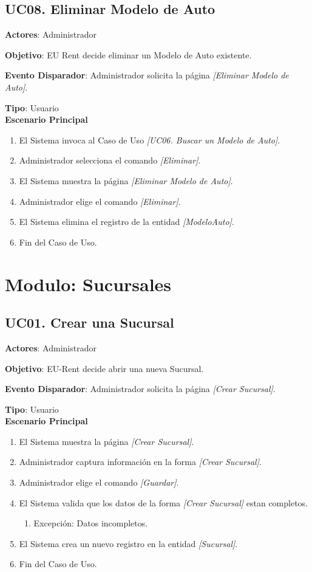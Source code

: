 \documentclass[10pt, letterpaper]{report}
\begin{document}
\subsection{UC08. Eliminar Modelo de Auto} \label{EliminarModeloAuto}
\textbf{Actores}: Administrador

\textbf{Objetivo}: EU Rent decide eliminar un Modelo de Auto existente.

\textbf{Evento Disparador}: Administrador solicita la página \textit{[Eliminar Modelo de Auto]}.

\textbf{Tipo}: Usuario\\

\textbf{Escenario Principal}

\begin{enumerate}
\item El Sistema invoca al Caso de Uso \textit{[UC06. Buscar un Modelo de Auto]}.
\item Administrador selecciona el comando \textit{[Eliminar]}.
\item El Sistema muestra la página \textit{[Eliminar Modelo de Auto]}.
\item Administrador elige el comando \textit{[Eliminar]}.
\item El Sistema elimina el registro de la entidad \textit{[ModeloAuto]}.
\item Fin del Caso de Uso.
\end{enumerate}
\section{Modulo: Sucursales}

\subsection{UC01. Crear una Sucursal} \label{CrearSucursal}
\textbf{Actores}: Administrador

\textbf{Objetivo}: EU-Rent decide abrir una nueva Sucursal.

\textbf{Evento Disparador}: Administrador solicita la página \textit{[Crear Sucursal]}.

\textbf{Tipo}: Usuario\\

\textbf{Escenario Principal}

\begin{enumerate}
\item El Sistema muestra la página \textit{[Crear Sucursal]}.
\item Administrador captura información en la forma \textit{[Crear Sucursal]}.
\item Administrador elige el comando \textit{[Guardar]}.
\item El Sistema valida que los datos de la forma \textit{[Crear Sucursal]} estan completos.
	\begin{enumerate}
		\item Excepción: Datos incompletos.
	\end{enumerate}
\item El Sistema crea un nuevo registro en la entidad \textit{[Sucursal]}.
\item Fin del Caso de Uso.
\end{enumerate}
\end{document}
